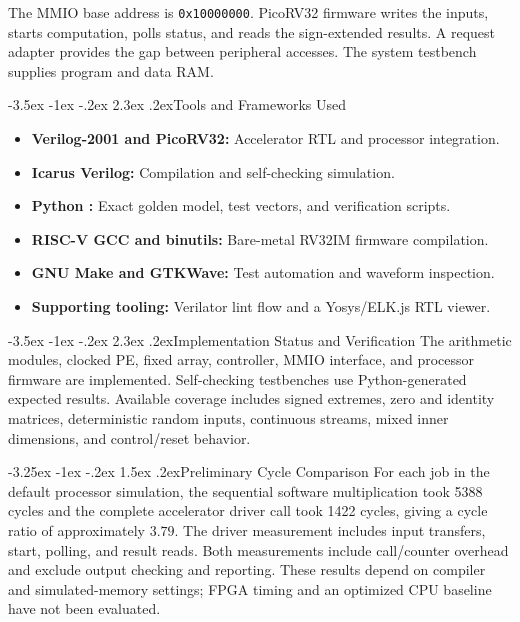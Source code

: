 \documentclass[12pt,a4paper]{article}
\makeatletter
\renewcommand\section{\@startsection{section}{1}{\z@}%
  {-3.5ex \@plus -1ex \@minus -.2ex}%
  {2.3ex \@plus .2ex}{\normalfont\large\bfseries}}
\renewcommand\subsection{\@startsection{subsection}{2}{\z@}%
  {-3.25ex \@plus -1ex \@minus -.2ex}%
  {1.5ex \@plus .2ex}{\normalfont\normalsize\bfseries}}
\makeatother
\begin{document}
The MMIO base address is \texttt{0x10000000}. PicoRV32 firmware writes the
inputs, starts computation, polls status, and reads the sign-extended results.
A request adapter provides the gap between peripheral accesses.
The system testbench supplies program and data RAM.

\section{Tools and Frameworks Used}
\begin{itemize}
    \item \textbf{Verilog-2001 and PicoRV32:} Accelerator RTL and processor integration.
    \item \textbf{Icarus Verilog:} Compilation and self-checking simulation.
    \item \textbf{Python :} Exact golden model, test vectors, and verification scripts.
    \item \textbf{RISC-V GCC and binutils:} Bare-metal RV32IM firmware compilation.
    \item \textbf{GNU Make and GTKWave:} Test automation and waveform inspection.
    \item \textbf{Supporting tooling:} Verilator lint flow and a Yosys/ELK.js RTL viewer.
\end{itemize}

\section{Implementation Status and Verification}
The arithmetic modules, clocked PE, fixed array, controller, MMIO interface,
and processor firmware are implemented. Self-checking testbenches use
Python-generated expected results. Available coverage includes signed
extremes, zero and identity matrices, deterministic random inputs,
continuous streams, mixed inner dimensions, and control/reset behavior.

\subsection{Preliminary Cycle Comparison}
For each job in the default processor simulation, the sequential software
multiplication took 5388 cycles and the complete accelerator driver call
took 1422 cycles, giving a cycle ratio of approximately $3.79$.
The driver measurement includes input transfers, start, polling, and result
reads. Both measurements include call/counter overhead and exclude output
checking and reporting. These results depend on compiler and simulated-memory
settings; FPGA timing and an optimized CPU baseline have not been evaluated.
\end{document}
